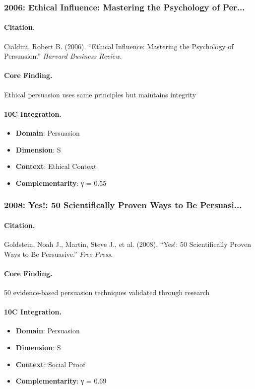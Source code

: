 \subsubsection{2006: Ethical Influence: Mastering the Psychology of Per...}

\paragraph{Citation.}
Cialdini, Robert B. (2006). ``Ethical Influence: Mastering the Psychology of Persuasion.''
\textit{Harvard Business Review}.

\paragraph{Core Finding.}
Ethical persuasion uses same principles but maintains integrity

\paragraph{10C Integration.}
\begin{itemize}[nosep]
  \item \textbf{Domain}: Persuasion
  \item \textbf{Dimension}: S
  \item \textbf{Context}: Ethical Context
  \item \textbf{Complementarity}: γ = 0.55
\end{itemize}

\subsubsection{2008: Yes!: 50 Scientifically Proven Ways to Be Persuasi...}

\paragraph{Citation.}
Goldstein, Noah J., Martin, Steve J., et al. (2008). ``Yes!: 50 Scientifically Proven Ways to Be Persuasive.''
\textit{Free Press}.

\paragraph{Core Finding.}
50 evidence-based persuasion techniques validated through research

\paragraph{10C Integration.}
\begin{itemize}[nosep]
  \item \textbf{Domain}: Persuasion
  \item \textbf{Dimension}: S
  \item \textbf{Context}: Social Proof
  \item \textbf{Complementarity}: γ = 0.69
\end{itemize}

